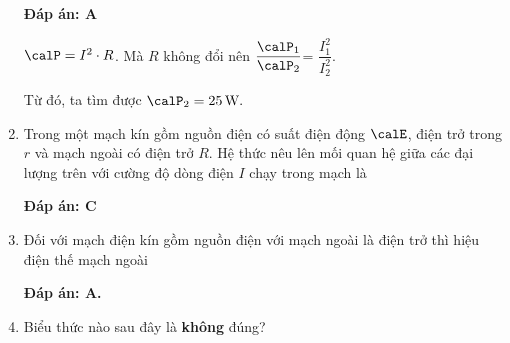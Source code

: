 \begin{enumerate}[label=\bfseries Câu \arabic*:]
	\hideall
	{			
		\textbf{Đáp án: A} 
		
		$\calP= I^2\cdot R$. Mà $R$ không đổi nên $\dfrac{\calP_1}{\calP_2}$= $\dfrac{I_1^2}{I_2^2}$. 
		
		Từ đó, ta tìm được $\calP_2=25\, \text{W}.$
		
	}

		\item {}
	
	
	{Trong một mạch kín gồm nguồn điện có suất điện động $\calE$, điện trở trong $r$ và mạch ngoài có điện trở $R$. Hệ thức nêu lên mối quan hệ giữa các đại lượng trên với cường độ dòng điện $I$ chạy trong mạch là
	}
	
	\hideall
	{	\textbf{Đáp án: C} 
		
		
		
	}
	\item {}
	
	
	{Đối với mạch điện kín gồm nguồn điện với mạch ngoài là điện trở thì hiệu điện thế mạch ngoài
	}
	
	\hideall
	{		\textbf{Đáp án: A.}
		
	
		
	}
	\item {}
	
	
	{Biểu thức nào sau đây là \textbf{không} đúng?
	}
	

\end{enumerate}
